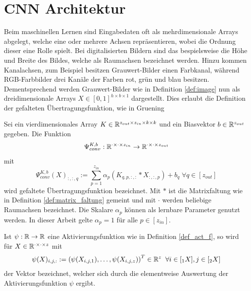 \section{CNN Architektur}

Beim maschinellen Lernen sind Eingabedaten oft als mehrdimensionale Arrays abgelegt, welche eine oder mehrere Achsen repräsentieren, wobei die Ordnung dieser eine Rolle spielt. Bei digitalisierten Bildern sind das bespielsweise die Höhe und Breite des Bildes, welche als Raumachsen bezeichnet werden. Hinzu kommen Kanalachsen, zum Beispiel besitzen Grauwert-Bilder einen Farbkanal, während RGB-Farbbilder drei Kanäle der Farben rot, grün und blau besitzen. Dementsprechend werden Grauwert-Bilder wie in Definition \ref{def:image} nun als dreidimensionale Arrays $X \in [0,1]^{h \times b \times 1}$ dargestellt. Dies erlaubt die Definition der gefalteten Übertragungsfunktion, wie in Gruening\cite{gruening}

\begin{defi}
    \label{eq:convlogit}
    Sei ein vierdimensionales Array $K \in \mathbb{R}^{z_{out} \times z_{in} \times k \times k}$ und ein Biasvektor $b \in \mathbb{R}^{z_{out}}$ gegeben. Die Funktion 
    \begin{equation*}
        \Psi_{conv}^{K,b}: \mathbb{R}^{\cdot \times \cdot \times z_{in}} \rightarrow \mathbb{R}^{\cdot \times \cdot\times z_{out}}
    \end{equation*}
    mit
    \begin{equation*}
        \Psi_{conv}^{K,b}(X)_{:,:,q}:= \sum_{p=1}^{z_{in}} \alpha_p\left(K_{q,p,:,:} \ast X_{:,:,p} \right) +b_q \; \forall q \in [z_{out}]
    \end{equation*}
    wird gefaltete Übertragungsfunktion bezeichnet. Mit $\ast$ ist die Matrixfaltung wie in Definition \ref{def:matrix_faltung} gemeint und mit $\cdot$ werden beliebige Raumachsen bezeichnet. Die Skalare $\alpha_p$ können als lernbare Parameter genutzt werden. In dieser Arbeit gelte $\alpha_p=1$ für alle $p \in [z_{in}]$.
\end{defi}


\begin{bem}
    Ist $\psi: \mathbb{R} \rightarrow \mathbb{R}$ eine Aktivierungsfunktion wie in Definition \ref{def_act_f}, so wird für $X \in \mathbb{R}^{\cdot \times \cdot \times z}$ mit 
    \[\psi(X)_{i,j,:}:=\left(\psi(X_{i,j,1}), \ldots, \psi(X_{i,j,z})\right)^T \in \mathbb{R}^z \; \; \forall i \in [{}_1 X], j \in [{}_2 X] 
    \]
    der Vektor bezeichnet, welcher sich durch die elementweise Auswertung der Aktivierungsfunktion $\psi$ ergibt.
\end{bem}

